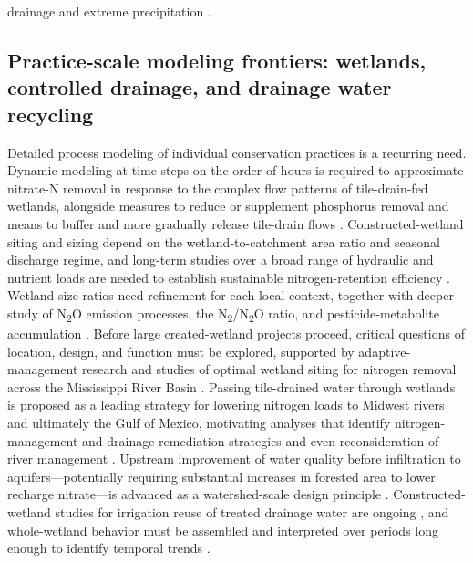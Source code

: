 drainage and extreme precipitation \parencite{Dalzell2011,Bellmore2015}.

\subsection{Practice-scale modeling frontiers: wetlands, controlled drainage, and drainage water recycling}

Detailed process modeling of individual conservation practices is a recurring need. Dynamic modeling at time-steps on the order of hours is required to approximate nitrate-N removal in response to the complex flow patterns of tile-drain-fed wetlands, alongside measures to reduce or supplement phosphorus removal and means to buffer and more gradually release tile-drain flows \parencite{Tanner2011}. Constructed-wetland siting and sizing depend on the wetland-to-catchment area ratio and seasonal discharge regime, and long-term studies over a broad range of hydraulic and nutrient loads are needed to establish sustainable nitrogen-retention efficiency \parencite{Steidl2019}. Wetland size ratios need refinement for each local context, together with deeper study of N\textsubscript{2}O emission processes, the N\textsubscript{2}/N\textsubscript{2}O ratio, and pesticide-metabolite accumulation \parencite{Tournebize2017}. Before large created-wetland projects proceed, critical questions of location, design, and function must be explored, supported by adaptive-management research and studies of optimal wetland siting for nitrogen removal across the Mississippi River Basin \parencite{Kovacic2006}. Passing tile-drained water through wetlands is proposed as a leading strategy for lowering nitrogen loads to Midwest rivers and ultimately the Gulf of Mexico, motivating analyses that identify nitrogen-management and drainage-remediation strategies and even reconsideration of river management \parencite{Baeumler2020}. Upstream improvement of water quality before infiltration to aquifers---potentially requiring substantial increases in forested area to lower recharge nitrate---is advanced as a watershed-scale design principle \parencite{Billy2013}. Constructed-wetland studies for irrigation reuse of treated drainage water are ongoing \parencite{Madramootoo2007}, and whole-wetland behavior must be assembled and interpreted over periods long enough to identify temporal trends \parencite{Kadlec2012}.


